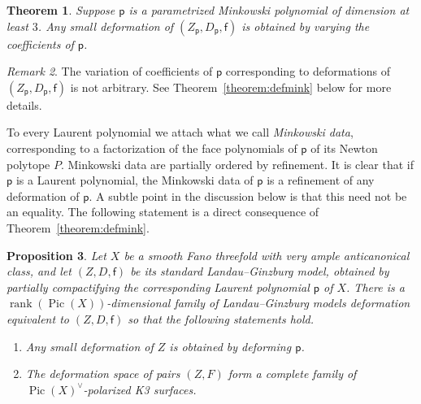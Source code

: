 \documentclass[10pt]{amsart}
\numberwithin{equation}{section}
\theoremstyle{plain}
\newtheorem{theorem}{Theorem}[section]
\newtheorem{proposition}[theorem]{Proposition}
\theoremstyle{definition}
\theoremstyle{remark}
\newtheorem{remark}[theorem]{Remark}
\DeclareMathOperator{\Pic}{Pic}
\DeclareMathOperator{\rk}{rank}
\begin{document}
\begin{theorem}
  Suppose \(\mathsf{p}\) is a parametrized Minkowski polynomial of dimension at least \(3\). Any small deformation of \((Z_\mathsf{p},D_\mathsf{p},\mathsf{f})\) is obtained by varying the coefficients of \(\mathsf{p}\).
\end{theorem}
\begin{remark}
    The variation of coefficients of \(\mathsf{p}\) corresponding to deformations of \((Z_\mathsf{p},D_\mathsf{p}, \mathsf{f})\) is not arbitrary. See Theorem~\ref{theorem:defmink} below for more details.
\end{remark}

To every Laurent polynomial we attach what we call \emph{Minkowski data}, corresponding to a factorization of the face polynomials of \(\mathsf{p}\) of its Newton polytope \(P\). Minkowski data are partially ordered by refinement. It is clear that if \(\mathsf{p}\) is a Laurent polynomial, the Minkowski data of \(\mathsf{p}\) is a refinement of any deformation of \(\mathsf{p}\). A subtle point in the discussion below is that this need not be an equality. The following statement is a direct consequence of Theorem~\ref{theorem:defmink}.

\begin{proposition}\label{proposition:invariance}
  Let \(X\) be a smooth Fano threefold with very ample anticanonical class, and let \((Z,D,\mathsf{f})\) be its standard Landau--Ginzburg model, obtained by partially compactifying the corresponding Laurent polynomial \(\mathsf{p}\) of \(X\). There is a \(\rk (\Pic(X))\)-dimensional family of Landau--Ginzburg models deformation equivalent to \((Z,D,\mathsf{f})\) so that the following statements hold.
  \begin{enumerate}
  \item Any small deformation of \(Z\) is obtained by deforming \(\mathsf{p}\).
  \item The deformation space of pairs \((Z,F)\) form a complete family of \(\Pic(X)^\vee\)-polarized K3 surfaces.
  \end{enumerate}
\end{proposition}
\end{document}
